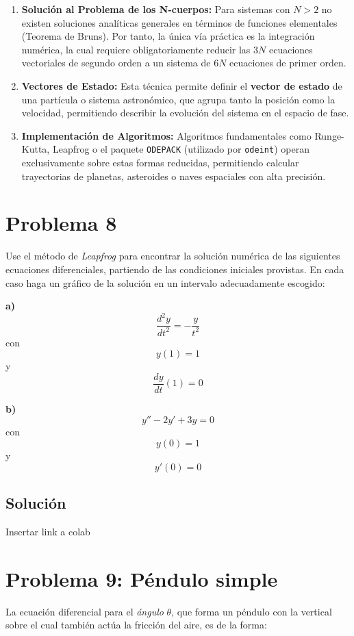 \documentclass[12pt, letterpaper]{article}
\begin{document}
\begin{enumerate}
    \item \textbf{Solución al Problema de los N-cuerpos:} Para sistemas con $N > 2$ no existen soluciones analíticas generales en términos de funciones elementales (Teorema de Bruns). Por tanto, la única vía práctica es la integración numérica, la cual requiere obligatoriamente reducir las $3N$ ecuaciones vectoriales de segundo orden a un sistema de $6N$ ecuaciones de primer orden.
    \item \textbf{Vectores de Estado:} Esta técnica permite definir el \textbf{vector de estado} de una partícula o sistema astronómico, que agrupa tanto la posición como la velocidad, permitiendo describir la evolución del sistema en el espacio de fase.
    \item \textbf{Implementación de Algoritmos:} Algoritmos fundamentales como Runge-Kutta, Leapfrog o el paquete \texttt{ODEPACK} (utilizado por \texttt{odeint}) operan exclusivamente sobre estas formas reducidas, permitiendo calcular trayectorias de planetas, asteroides o naves espaciales con alta precisión.
\end{enumerate}


\section{Problema 8}

Use el método de \textit{Leapfrog} para encontrar la solución numérica de las siguientes ecuaciones diferenciales, partiendo de las condiciones iniciales provistas. En cada caso haga un gráfico de la solución en un intervalo adecuadamente escogido:

\textbf{a)}
$$ \frac{d^2y}{dt^2} = -\frac{y}{t^2} $$
con $$ y(1) = 1 $$ y $$ \frac{dy}{dt}(1) = 0 $$

\textbf{b)}
$$ y'' - 2y' + 3y = 0 $$
con $$ y(0) = 1 $$ y $$ y'(0) = 0 $$

\subsection{Solución}

Insertar link a colab

\section{Problema 9: Péndulo simple}

La ecuación diferencial para el \textit{ángulo} $\theta$, que forma un péndulo con la vertical sobre el cual también actúa la fricción del aire, es de la forma:
\end{document}
